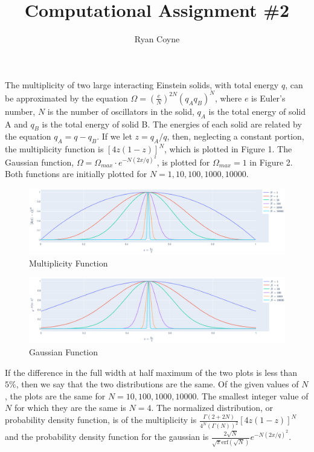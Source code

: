 \documentclass[12pt]{article}
\begin{document}
    \title{Computational Assignment \#2}
    \author{Ryan Coyne}
    \maketitle

    The multiplicity of two large interacting Einstein solids, with total energy \(q\), can be approximated by the equation \(\Omega = \left( \frac{e}{N} \right)^{2N}(q_Aq_B)^N\), where \(e\) is Euler's number, \(N\) is the number of oscillators in the solid, \(q_A\) is the total energy of solid A and \(q_B\) is the total energy of solid B. The energies of each solid are related by the equation \(q_A=q-q_B\). If we let \(z = q_A/q\), then, neglecting a constant portion, the multiplicity function is \(\left[ 4z(1-z) \right]^N\), which is plotted in Figure 1. The Gaussian function, \(\Omega = \Omega_{max}\cdot e^{-N(2x/q)^2}\), is plotted for \(\Omega_{max}=1\) in Figure 2. Both functions are initially plotted for \(N=1,10,100,1000,10000\). 
    
    \begin{figure}[h]
        \caption{Multiplicity Function}
        \centering
        \includegraphics[width=\linewidth]{multiplicity.png}
    \end{figure}

    \begin{figure}[h]
        \caption{Gaussian Function}
        \centering
        \includegraphics[width=\linewidth]{gaussian.png}
    \end{figure}
    
    If the difference in the full width at half maximum of the two plots is less than \(5\%\), then we say that the two distributions are the same. Of the given values of \(N\), the plots are the same for \(N=10, 100, 1000, 10000\). The smallest integer value of \(N\) for which they are the same is \(N=4\). The normalized distribution, or probability density function, is of the multiplicity is \(\frac{\Gamma(2+2N)}{4^N(\Gamma(N))^2} \left[ 4z(1-z) \right]^N\) and the probability density function for the gaussian is \(\frac{2\sqrt{N}}{\sqrt{\pi}\mathrm{erf}(\sqrt{N})} e^{-N(2x/q)^2}\).
\end{document}
